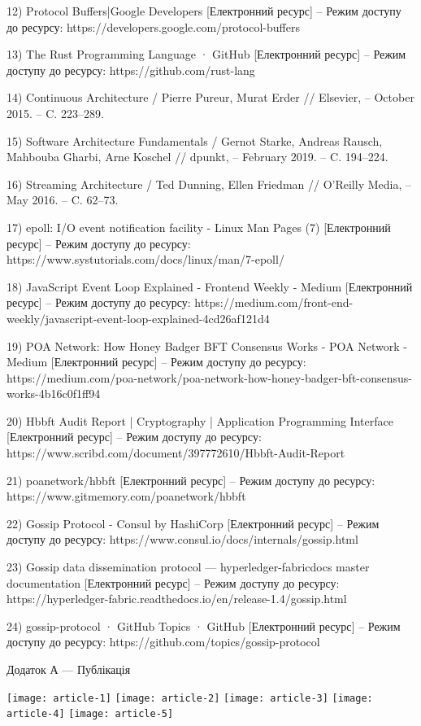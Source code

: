 \documentclass{lib/styles/default-style}
\begin{document}
    12) Protocol Buffers|Google Developers [Електронний ресурс] – Режим доступу до ресурсу: https://developers.google.com/protocol-buffers

    13) The Rust Programming Language · GitHub [Електронний ресурс] – Режим доступу до ресурсу: https://github.com/rust-lang

    14) Continuous Architecture / Pierre Pureur, Murat Erder // Elsevier, – October 2015. – C. 223–289.

    15) Software Architecture Fundamentals / Gernot Starke, Andreas Rausch, Mahbouba Gharbi, Arne Koschel // dpunkt, – February 2019. – C. 194–224.

    16) Streaming Architecture / Ted Dunning, Ellen Friedman // O'Reilly Media, – May 2016. – C. 62–73.

    17) epoll: I/O event notification facility - Linux Man Pages (7) [Електронний ресурс] – Режим доступу до ресурсу: https://www.systutorials.com/docs/linux/man/7-epoll/
    
    18) JavaScript Event Loop Explained - Frontend Weekly - Medium [Електронний ресурс] – Режим доступу до ресурсу: https://medium.com/front-end-weekly/javascript-event-loop-explained-4cd26af121d4

    19) POA Network: How Honey Badger BFT Consensus Works - POA Network - Medium [Електронний ресурс] – Режим доступу до ресурсу: https://medium.com/poa-network/poa-network-how-honey-badger-bft-consensus-works-4b16c0f1ff94

    20) Hbbft Audit Report | Cryptography | Application Programming Interface [Електронний ресурс] – Режим доступу до ресурсу: https://www.scribd.com/document/397772610/Hbbft-Audit-Report

    21) poanetwork/hbbft [Електронний ресурс] – Режим доступу до ресурсу: https://www.gitmemory.com/poanetwork/hbbft

    22) Gossip Protocol - Consul by HashiCorp [Електронний ресурс] – Режим доступу до ресурсу: https://www.consul.io/docs/internals/gossip.html

    23) Gossip data dissemination protocol — hyperledger-fabricdocs master documentation [Електронний ресурс] – Режим доступу до ресурсу: https://hyperledger-fabric.readthedocs.io/en/release-1.4/gossip.html

    24) gossip-protocol · GitHub Topics · GitHub [Електронний ресурс] – Режим доступу до ресурсу: https://github.com/topics/gossip-protocol

\newpage
{}
\begin{center}Додаток А --- Публікація\end{center}
\texttt{[image: article-1]}
\newpage
\texttt{[image: article-2]}
\newpage
\texttt{[image: article-3]}
\newpage
\texttt{[image: article-4]}
\newpage
\texttt{[image: article-5]}
\end{document}
